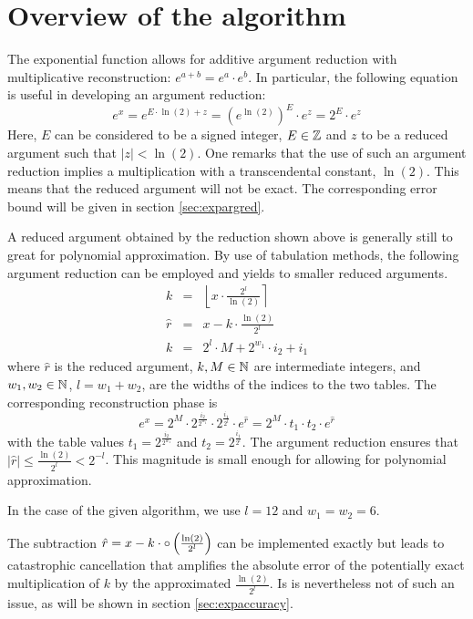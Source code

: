 \section{Overview of the algorithm}
The exponential function allows for additive argument reduction with
multiplicative reconstruction: $e^{a + b} = e^a \cdot e^b$. In
particular, the following equation is useful in developing an
argument reduction:
$$e^x = e^{E \cdot \ln\left(2\right) + z} = \left(e^{\ln\left( 2
\right)}\right)^E \cdot e^z = 2^E \cdot e^z$$ Here, $E$ can be
considered to be a signed integer, $E \in \mathbb {Z}$ and $z$ to be a reduced
argument such that $\left \vert z \right \vert <
\ln\left(2\right)$. One remarks that the use of such an argument
reduction implies a multiplication with a transcendental constant,
$\ln\left( 2 \right)$.  This means that the reduced argument will not
be exact. The corresponding error bound will be given in section
\ref{sec:expargred}.

A reduced argument obtained by the reduction shown above is generally
still to great for polynomial approximation. By use of tabulation
methods, the following argument reduction can be employed and yields
to smaller reduced arguments.
\begin{eqnarray*}
k & = & \left \lfloor x \cdot \frac{2^l}{\ln\left(2 \right)} \right \rceil \\
\hat{r} & = & x - k \cdot \frac{\ln\left( 2 \right)}{2^l} \\
k & = & 2^l \cdot M + 2^{w_1} \cdot i_2 + i_1 
\end{eqnarray*}
where $\hat{r}$ is the reduced argument, $k, M \in \mathbb {N}$ are intermediate
integers, and $w_1, w_2 \in \mathbb {N}$, $l = w_1 + w_2$, are the widths of
the indices to the two tables. The corresponding reconstruction phase
is
$$e^x = 2^M \cdot 2^{\frac{i_2}{2^{w_1}}} \cdot 2^{\frac{i_1}{2^l}}
\cdot e^{\hat{r}} = 2^M \cdot t_1 \cdot t_2 \cdot e^{\hat{r}}$$ with the table values $t_1 =
2^{\frac{i_2}{2^{w_1}}}$ and $t_2 = 2^{\frac{i_1}{2^l}}$. The argument
reduction ensures that $\left \vert \hat{r} \right \vert \leq
\frac{\ln\left( 2 \right)}{2^l} < 2^{-l}$. This magnitude is small enough for 
allowing for polynomial approximation.

In the case of the given algorithm, we use $l = 12$ and $w_1 = w_2 = 6$.

The subtraction $\hat{r} = x - k \cdot \circ \left(\frac{\ln\left( 2
\right)}{2^l}\right)$ can be implemented exactly but leads to
catastrophic cancellation that amplifies the absolute error of the
potentially exact multiplication of $k$ by the approximated
$\frac{\ln\left( 2 \right)}{2^l}$. Is is nevertheless not of such an
issue, as will be shown in section \ref{sec:expaccuracy}.                  %

